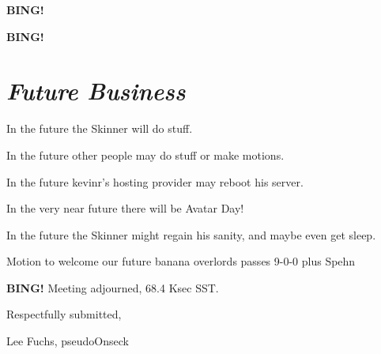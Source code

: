 \documentclass[10pt]{article}
\newcommand{\bing}{{\bf BING!} }
\newcommand{\goto}[1]{\bing \vskip 12pt \section*{{\em{#1}}}}
\newcommand{\ps}{ plus Spehn\xspace}
\newcommand{\onseck}{Lee Fuchs, pseudoOnseck}
\begin{document}
\bing

\goto{Future Business}

In the future the Skinner will do stuff.

In the future other people may do stuff or make motions.

In the future kevinr's hosting provider may reboot his server.

In the very near future there will be Avatar Day!

In the future the Skinner might regain his sanity, and maybe even get sleep.

Motion to welcome our future banana overlords passes 9-0-0 \ps

\bing
\noindent
Meeting adjourned, 68.4 Ksec SST.

\vspace{18pt}

\centerline{Respectfully submitted,}
\centerline{\onseck}
\end{document}
